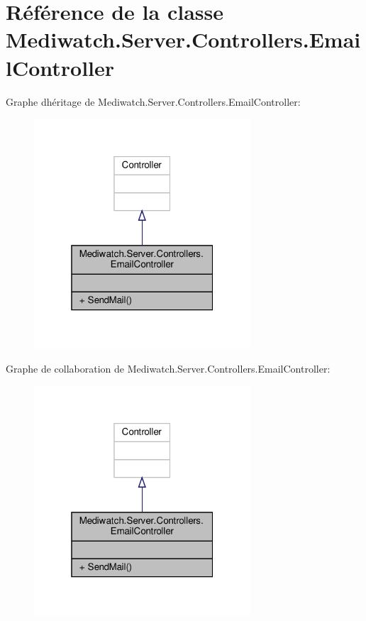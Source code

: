 \hypertarget{class_mediwatch_1_1_server_1_1_controllers_1_1_email_controller}{}\section{Référence de la classe Mediwatch.\+Server.\+Controllers.\+Email\+Controller}
\label{class_mediwatch_1_1_server_1_1_controllers_1_1_email_controller}


Graphe d\textquotesingle{}héritage de Mediwatch.\+Server.\+Controllers.\+Email\+Controller\+:
\nopagebreak
\begin{figure}[H]
\begin{center}
\leavevmode
\includegraphics[width=229pt]{class_mediwatch_1_1_server_1_1_controllers_1_1_email_controller__inherit__graph}
\end{center}
\end{figure}


Graphe de collaboration de Mediwatch.\+Server.\+Controllers.\+Email\+Controller\+:
\nopagebreak
\begin{figure}[H]
\begin{center}
\leavevmode
\includegraphics[width=229pt]{class_mediwatch_1_1_server_1_1_controllers_1_1_email_controller__coll__graph}
\end{center}
\end{figure}
